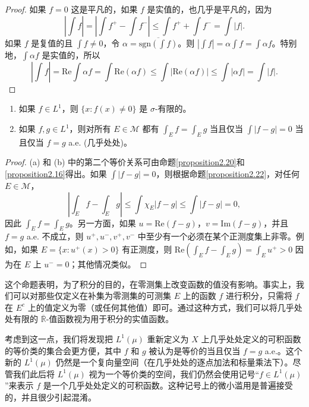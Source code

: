 \documentclass[lang=cn,10pt,thmcnt=section]{elegantbook}
\begin{document}
\begin{proof}
如果 $f=0$ 这是平凡的，如果 $f$ 是实值的，也几乎是平凡的，因为
\[ \left|\int f\right| = \left|\int f^+ - \int f^-\right| \le \int f^+ + \int f^- = \int |f|. \]
如果 $f$ 是复值的且 $\int f \neq 0$，令 $\alpha = \overline{\mathrm{sgn}(\int f)}$。则 $|\int f| = \alpha \int f = \int \alpha f$。特别地，$\int \alpha f$ 是实值的，所以
\[ \left|\int f\right| = \mathrm{Re} \int \alpha f = \int \mathrm{Re}(\alpha f) \le \int |\mathrm{Re}(\alpha f)| \le \int |\alpha f| = \int |f|. \]
\end{proof}

\begin{proposition}\label{proposition2.23}
\begin{enumerate}[label=\alph*.]
	\item 如果 $f \in L^1$，则 $\{x : f(x) \neq 0\}$ 是 $\sigma$-有限的。
	\item 如果 $f, g \in L^1$，则对所有 $E \in \mathcal{M}$ 都有 $\int_E f = \int_E g$ 当且仅当 $\int |f-g| = 0$ 当且仅当 $f=g$ a.e. (几乎处处)。
\end{enumerate}
\end{proposition}

\begin{proof}
(a) 和 (b) 中的第二个等价关系可由命题\ref{proposition2.20}和\ref{proposition2.16}得出。如果 $\int |f-g|=0$，则根据命题\ref{proposition2.22}，对任何 $E \in \mathcal{M}$，
\[ \left|\int_E f - \int_E g\right| \le \int \chi_E |f-g| \le \int |f-g| = 0, \]
因此 $\int_E f = \int_E g$。另一方面，如果 $u = \mathrm{Re}(f-g)$，$v = \mathrm{Im}(f-g)$，并且 $f=g$ a.e. 不成立，则 $u^+, u^-, v^+, v^-$ 中至少有一个必须在某个正测度集上非零。例如，如果 $E = \{x: u^+(x) > 0\}$ 有正测度，则 $\mathrm{Re}(\int_E f - \int_E g) = \int_E u^+ > 0$ 因为在 $E$ 上 $u^- = 0$；其他情况类似。
\end{proof}

这个命题表明，为了积分的目的，在零测集上改变函数的值没有影响。事实上，我们可以对那些仅定义在补集为零测集的可测集 $E$ 上的函数 $f$ 进行积分，只需将 $f$ 在 $E^c$ 上的值定义为零（或任何其他值）即可。通过这种方式，我们可以将几乎处处有限的 $\overline{\mathbb{R}}$-值函数视为用于积分的实值函数。

考虑到这一点，我们将发现把 $L^1(\mu)$ 重新定义为 $X$ 上几乎处处定义的可积函数的等价类的集合会更方便，其中 $f$ 和 $g$ 被认为是等价的当且仅当 $f=g$ a.e.。这个新的 $L^1(\mu)$ 仍然是一个复向量空间（在几乎处处的逐点加法和标量乘法下）。尽管我们此后将 $L^1(\mu)$ 视为一个等价类的空间，我们仍然会使用记号“$f \in L^1(\mu)$”来表示 $f$ 是一个几乎处处定义的可积函数。这种记号上的微小滥用是普遍接受的，并且很少引起混淆。
\end{document}
